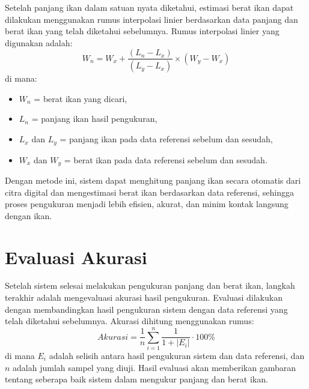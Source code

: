     Setelah panjang ikan dalam satuan nyata diketahui, estimasi berat ikan dapat dilakukan menggunakan rumus interpolasi linier berdasarkan data panjang dan berat ikan yang telah diketahui sebelumnya. Rumus interpolasi linier yang digunakan adalah:
\begin{equation}
    W_n = W_x + \frac{(L_n - L_x)}{(L_y - L_x)} \times (W_y - W_x)
\end{equation}
    di mana:
\begin{itemize}
    \item \(W_n\) = berat ikan yang dicari,
    \item \(L_n\) = panjang ikan hasil pengukuran,
    \item \(L_x\) dan \(L_y\) = panjang ikan pada data referensi sebelum dan sesudah,
    \item \(W_x\) dan \(W_y\) = berat ikan pada data referensi sebelum dan sesudah.
\end{itemize}

    Dengan metode ini, sistem dapat menghitung panjang ikan secara otomatis dari citra digital dan mengestimasi berat ikan berdasarkan data referensi, sehingga proses pengukuran menjadi lebih efisien, akurat, dan minim kontak langsung dengan ikan.

\section{Evaluasi Akurasi}
    Setelah sistem selesai melakukan pengukuran panjang dan berat ikan, langkah terakhir adalah mengevaluasi akurasi hasil pengukuran. Evaluasi dilakukan dengan membandingkan hasil pengukuran sistem dengan data referensi yang telah diketahui sebelumnya. 
    Akurasi dihitung menggunakan rumus:
\begin{equation}
    Akurasi = \frac{1}{n} \sum_{i=1}^{n} \frac{1}{1 + |E_i|} \cdot 100\%
\end{equation}
    di mana \(E_i\) adalah selisih antara hasil pengukuran sistem dan data referensi, dan \(n\) adalah jumlah sampel yang diuji. Hasil evaluasi akan memberikan gambaran tentang seberapa baik sistem dalam mengukur panjang dan berat ikan.